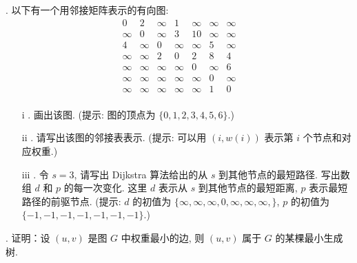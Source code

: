 \documentclass[a4paper]{ctexart}
\theoremstyle{definition}
\theoremstyle{definition}
\begin{document}
. 以下有一个用邻接矩阵表示的有向图:
$$
\begin{array}{ccccccc}
    0 & 2 & \infty & 1 & \infty & \infty & \infty \\
    \infty & 0 & \infty & 3 & 10 & \infty & \infty \\
    4 & \infty & 0 & \infty & \infty & 5 & \infty \\
    \infty & \infty & 2 & 0 & 2 & 8 & 4 \\
    \infty & \infty & \infty & \infty & 0 & \infty & 6 \\
    \infty & \infty & \infty & \infty & \infty & 0 & \infty \\
    \infty & \infty & \infty & \infty & \infty & 1 & 0 \\
\end{array}
$$
\begin{enumerate}
    \item[i]. 画出该图. (提示: 图的顶点为 $\{0, 1, 2, 3, 4, 5, 6\}$.)
    \item[ii]. 请写出该图的邻接表表示. 
    (提示: 可以用 $(i, w(i))$ 表示第 $i$ 个节点和对应权重.)  
    \item[iii]. 令 $s = 3$, 请写出 Dijkstra 算法给出的从 $s$ 到其他节点的最短路径. 
    写出数组 $d$ 和 $p$ 的每一次变化. 这里 $d$ 表示从 $s$ 到其他节点的最短距离, 
    $p$ 表示最短路径的前驱节点. 
    (提示: $d$ 的初值为 $\{\infty, \infty, \infty, 0, \infty, \infty, \infty, \}$, 
    $p$ 的初值为 $\{-1, -1, -1, -1, -1, -1, -1\}$.)
\end{enumerate}

. 证明：设 $(u, v)$ 是图 $G$ 中权重最小的边, 
则 $(u, v)$ 属于 $G$ 的某棵最小生成树.




  
  
\end{document}
